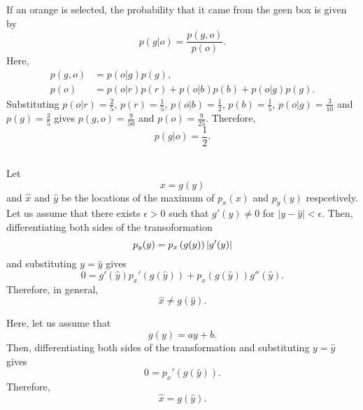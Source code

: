 If an orange is selected, the probability that it came from the geen box is given by
%
\begin{equation}
p(g | o) = \frac{p(g, o)}{p(o)}.
\end{equation}
%
Here,
%
\begin{equation}
\begin{aligned}
p(g, o) &= p(o | g) p(g), \\
p(o) & = p(o | r) p(r) + p(o | b) p(b) + p(o | g) p(g).
\end{aligned}
\end{equation}
%
Substituting $p(o | r) = \frac{2}{5}$, $p(r) = \frac{1}{5}$, $p(o | b) = \frac{1}{2}$, $p(b) = \frac{1}{5}$, $p(o | g) = \frac{3}{10}$ and $p(g) = \frac{3}{5}$ gives $p(g, o) = \frac{9}{50}$ and $p(o) = \frac{9}{25}$.
%
Therefore,
\begin{equation}
p(g | o) = \frac{1}{2}.
\end{equation}


\subsection{}
\label{1.4}
Let 
%
\begin{equation}
x = g(y)
\end{equation}
%
and $\hat{x}$ and $\hat{y}$ be the locations of the maximum of $p_x(x)$ and $p_y(y)$ respcetively.
Let us assume that there exists $\epsilon > 0$ such that $g'(y) \neq 0$ for $\left| y - \hat{y} \right| < \epsilon$.
Then, differentiating both sides of the transoformation
%
\begin{equation}
p_y(y) = p_x \left( g(y) \right) \abs{g'(y)}
\end{equation}
%
and substituting $y = \hat{y}$ gives
%
\begin{equation}
0 = g'(\hat{y}) p_x' \left( g \left( \hat{y} \right) \right) + p_x \left( g \left( \hat{y} \right) \right) g'' \left( \hat{y} \right).
\end{equation}
%
Therefore, in general,
%
\begin{equation}
\hat{x} \neq g \left( \hat{y} \right).
\end{equation}
%

Here, let us assume that 
%
\begin{equation}
g(y) = a y + b.
\end{equation}
%
Then, differentiating both sides of the transformation and substituting $y = \hat{y}$ gives
%
\begin{equation}
0 = p_x' \left( g \left( \hat{y} \right) \right).
\end{equation}
%
Therefore, 
%
\begin{equation}
\hat{x} = g \left( \hat{y} \right).
\end{equation}
%


